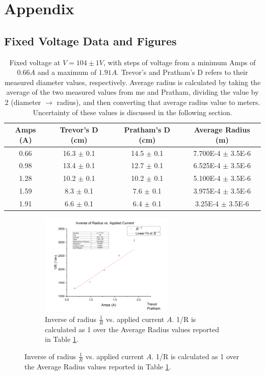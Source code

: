 \documentclass[12pt]{article}
\begin{document}
\clearpage
\appendix
\section{Appendix}
\subsection{Fixed Voltage Data and Figures}

\begin{table}[h]
    \centering
    \begin{tabular}{|c|c|c|c|}
        \hline
        Amps (A) & Trevor's D (cm) & Pratham's D (cm) & Average Radius (m) \\ 
        \hline
        0.66 & 16.3 $\pm$ 0.1 & 14.5 $\pm$ 0.1 & 7.700E-4 $\pm$ 3.5E-6 \\ 
        0.98 & 13.4 $\pm$ 0.1 & 12.7 $\pm$ 0.1 & 6.525E-4 $\pm$ 3.5E-6 \\ 
        1.28 & 10.2 $\pm$ 0.1 & 10.2 $\pm$ 0.1 & 5.100E-4 $\pm$ 3.5E-6 \\ 
        1.59 & 8.3 $\pm$ 0.1 & 7.6 $\pm$ 0.1 & 3.975E-4 $\pm$ 3.5E-6 \\
        1.91 & 6.6 $\pm$ 0.1 & 6.4 $\pm$ 0.1 & 3.25E-4 $\pm$ 3.5E-6 \\
        \hline
    \end{tabular}
    \caption{Fixed voltage at $V=104\pm1 V$, with steps of voltage from a minimum Amps of $0.66 A$ and a maximum of $1.91 A$. Trevor's and Pratham's D refers to their measured diameter values, respectively. Average radius is calculated by taking the average of the two measured values from me and Pratham, dividing the value by 2 (diameter $\to$ radius), and then converting that average radius value to meters. Uncertainty of these values is discussed in the following section.}
    \label{t:FixV}
\end{table}

\begin{figure} [h]
    \begin{subfigure}
        \centering
        \includegraphics[width=0.7\textwidth]{figures/EOM_Fix_Voltage.png}
        \caption{Inverse of radius $\frac{1}{R}$ vs. applied current $A$. 1/R is calculated as 1 over the Average Radius values reported in Table \ref{t:FixV}.}
        \label{f:FixV}
    \end{subfigure}
\end{figure}
\end{document}
